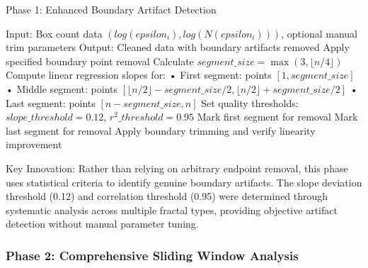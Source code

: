 \documentclass[preprint,12pt]{elsarticle}
\def\textbf#1{#1}%
\def\epsilon{epsilon}%
\begin{document}
\begin{algorithm}[!htbp]
\caption{Phase 1: Enhanced Boundary Artifact Detection}
\begin{algorithmic}[1]
\State \textbf{Input:} Box count data $(log(\epsilon_i), log(N(\epsilon_i)))$, optional manual trim parameters
\State \textbf{Output:} Cleaned data with boundary artifacts removed
\State
{}
    \State Apply specified boundary point removal
\EndIf
\State
{}
    \State Calculate $segment\_size = \max(3, \lfloor n/4 \rfloor)$
    \State Compute linear regression slopes for:
    \State \hspace{1em} • First segment: points $[1, segment\_size]$
    \State \hspace{1em} • Middle segment: points $[\lfloor n/2 \rfloor - segment\_size/2, \lfloor n/2 \rfloor + segment\_size/2]$
    \State \hspace{1em} • Last segment: points $[n - segment\_size, n]$
    \State
    \State Set quality thresholds: $slope\_threshold = 0.12$, $r^2\_threshold = 0.95$
    \State
        \State Mark first segment for removal
    \EndIf
        \State Mark last segment for removal
    \EndIf
    \State
    \State Apply boundary trimming and verify linearity improvement
\EndIf
\end{algorithmic}
\end{algorithm}

\textbf{Key Innovation}: Rather than relying on arbitrary endpoint removal, this phase uses statistical criteria to identify genuine boundary artifacts. The slope deviation threshold (0.12) and correlation threshold (0.95) were determined through systematic analysis across multiple fractal types, providing objective artifact detection without manual parameter tuning.

\subsubsection{Phase 2: Comprehensive Sliding Window Analysis}
\end{document}
